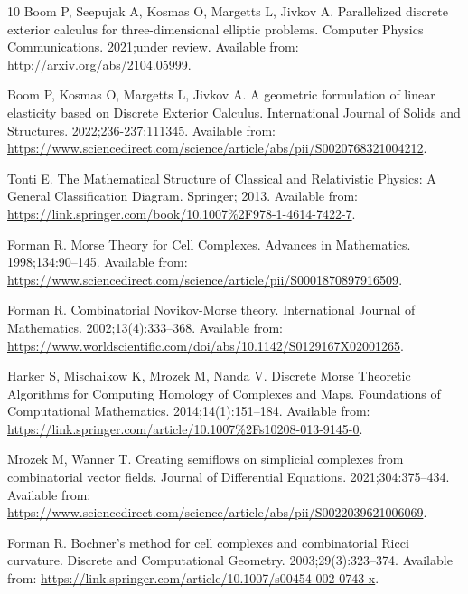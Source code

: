 \documentclass{elsarticle}
\theoremstyle{definition}
\begin{document}
\begin{thebibliography}{10}
Boom P, Seepujak A, Kosmas O, Margetts L, Jivkov A.
\newblock Parallelized discrete exterior calculus for three-dimensional
  elliptic problems.
\newblock Computer Physics Communications. 2021;under review.
\newblock Available from: \url{http://arxiv.org/abs/2104.05999}.

Boom P, Kosmas O, Margetts L, Jivkov A.
\newblock A geometric formulation of linear elasticity based on Discrete
  Exterior Calculus.
\newblock International Journal of Solids and Structures. 2022;236-237:111345.
\newblock Available from:
  \url{https://www.sciencedirect.com/science/article/abs/pii/S0020768321004212}.

Tonti E.
\newblock The Mathematical Structure of Classical and Relativistic Physics: A
  General Classification Diagram.
\newblock Springer; 2013.
\newblock Available from:
  \url{https://link.springer.com/book/10.1007%2F978-1-4614-7422-7}.

Forman R.
\newblock Morse Theory for Cell Complexes.
\newblock Advances in Mathematics. 1998;134:90--145.
\newblock Available from:
  \url{https://www.sciencedirect.com/science/article/pii/S0001870897916509}.

Forman R.
\newblock Combinatorial Novikov-Morse theory.
\newblock International Journal of Mathematics. 2002;13(4):333--368.
\newblock Available from:
  \url{https://www.worldscientific.com/doi/abs/10.1142/S0129167X02001265}.

Harker S, Mischaikow K, Mrozek M, Nanda V.
\newblock Discrete Morse Theoretic Algorithms for Computing Homology of
  Complexes and Maps.
\newblock Foundations of Computational Mathematics. 2014;14(1):151--184.
\newblock Available from:
  \url{https://link.springer.com/article/10.1007%2Fs10208-013-9145-0}.

Mrozek M, Wanner T.
\newblock Creating semiflows on simplicial complexes from combinatorial vector
  fields.
\newblock Journal of Differential Equations. 2021;304:375--434.
\newblock Available from:
  \url{https://www.sciencedirect.com/science/article/abs/pii/S0022039621006069}.

Forman R.
\newblock Bochner's method for cell complexes and combinatorial Ricci
  curvature.
\newblock Discrete and Computational Geometry. 2003;29(3):323--374.
\newblock Available from:
  \url{https://link.springer.com/article/10.1007/s00454-002-0743-x}.


\end{thebibliography}
\end{document}

